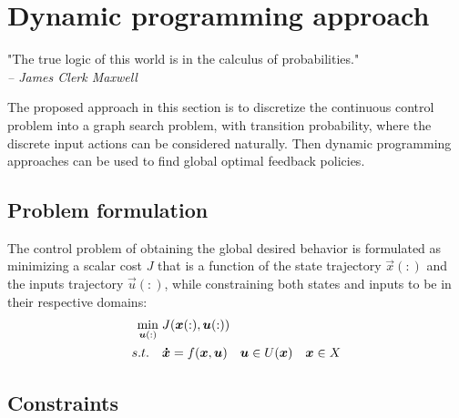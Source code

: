 
\newpage

\section{Dynamic programming approach}
\label{sec:DynamicProgrammingAproach}

\begin{flushright}
\small"The true logic of this world is in the calculus of probabilities." \\ \emph{-- James Clerk Maxwell}
\end{flushright}

The proposed approach in this section is to discretize the continuous control problem into a graph search problem, with transition probability, where the discrete input actions can be considered naturally. Then dynamic programming approaches can be used to find global optimal feedback policies. 


\subsection{Problem formulation}

The control problem of obtaining the global desired behavior is formulated as minimizing a scalar cost $J$ that is a function of the state trajectory $\vec{x}(:)$ and the inputs trajectory $\vec{u}(:)$, while constraining both states and inputs to be in their respective domains:
\begin{align}
	\operatornamewithlimits{min}\limits_{\vec{u}(:)} \; & J(\vec{x}(:),\vec{u}(:)) \\
	s.t. \quad & \vec{\dot{x}} = f(\vec{x}, \vec{u}) \quad \vec{u} \in U(\vec{x}) \quad \vec{x} \in X 
	\label{eq:min}
\end{align}

\subsection{Constraints}

